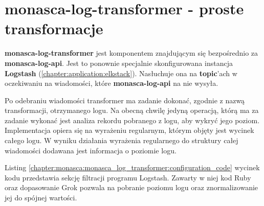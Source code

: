 \section{monasca-log-transformer - proste transformacje}
\label{chapter:monasca:monasca_log_transformer}

\textbf{monasca-log-transformer} jest komponentem znajdującym się bezpośrednio \linebreak za \textbf{monasca-log-api}. Jest to ponownie specjalnie skonfigurowana instancja
\textbf{Logstash} (\ref{chapter:application:elkstack}). Nasłuchuje ona na \textbf{topic}'ach w oczekiwaniu
na wiadomości, które \textbf{monasca-log-api} na nie wysyła. 

Po odebraniu wiadomości transformer ma zadanie dokonać, zgodnie z nazwą transformacji, otrzymanego 
logu. Na obecną chwilę jedyną operacją, którą ma za zadanie wykonać jest analiza rekordu pobranego z logu,
aby wykryć jego poziom. Implementacja opiera się na wyrażeniu regularnym, którym objęty jest wycinek
całego logu. W wyniku działania wyrażenia regularnego do struktury całej wiadomości dodawana jest informacja
o poziomie logu. 


Listing \ref{chapter:monasca:monasca_log_transformer:configuration_code} wycinek kodu przedstawia
sekcję filtracji programu Logstash. Zawarty w niej kod Ruby oraz dopasowanie Grok pozwala na 
pobranie poziomu logu oraz znormalizowanie jej do spójnej wartości. 